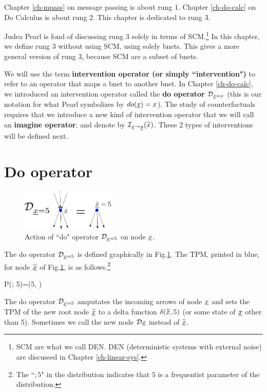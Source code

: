 Chapter \ref{ch-mpass}
on message passing
is about rung 1.
Chapter \ref{ch-do-calc}
on Do Calculus is about rung 2.
This chapter is dedicated to rung 3.

Judea Pearl
is fond of discussing rung 3 solely
in terms of SCM.\footnote{SCM are
what we call DEN. DEN (deterministic systems
with external noise) are discussed in
Chapter \ref{ch-linear-sys}. }
In this chapter,
we define rung 3
without using SCM, using solely
bnets.
This gives a more general
version of rung 3,
because SCM are a subset of bnets.



We will use the
term {\bf intervention operator (or simply ``intervention")}
to refer to an operator
that maps a bnet to another bnet.
In Chapter \ref{ch-do-calc},
we introduced an intervention operator
 called the {\bf do operator}
${\cal D}_{{\underline{x}}=x}$ (this is our notation for what Pearl
symbolizes by $do({\underline{x}})=x$).
The study of counterfactuals
requires that we
introduce a new
kind of intervention
operator that we will
call an {\bf imagine operator},
and denote by ${\cal I}_{{\underline{x}}\rightarrow{\underline{y}}}(\widetilde{x})$.
These 2 types of interventions
will be defined
next.

\section{Do operator}


\begin{figure}[h!]
\centering
\includegraphics[width=1.75in]
{counterf/rho-op.png}
\caption{Action
of ``do" operator ${\cal D}_{{\underline{x}}=5}$
on node ${\underline{x}}$.}
\label{fig-rho-op}
\end{figure}

The do operator ${\cal D}_{{\underline{x}}=5}$
is defined graphically in Fig.\ref{fig-rho-op}.
The TPM, printed in blue,
 for node $\widetilde{{\underline{x}}}$ of Fig.\ref{fig-rho-op},
is as follows.\footnote{The ``$;5$" 
in the distribution
indicates that $5$ 
is a frequentist parameter of the distribution.}

\beq\color{blue}
P(; 5)=\delta(5, )
\eeq


The do operator ${\cal D}_{{\underline{x}}=5}$
amputates
the incoming arrows of node ${\underline{x}}$
and sets the TPM
of the new root node $\widetilde{{\underline{x}}}$
to a delta function $\delta(
\widetilde{x}, 5)$
(or some state of ${\underline{x}}$
 other than 5).
Sometimes we call the new node
${\cal D}{\underline{x}}$
instead of
$\widetilde{{\underline{x}}}$.


